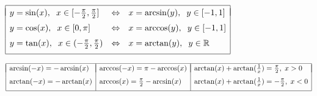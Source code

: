 \documentclass{article}
\begin{document}
$\begin{array}{|lll|}\hline && \\*[-9pt]
  y=\sin(x),\hspace{2 mm} x\in[-\frac{\pi}{2},\frac{\pi}{2}]&
  \iff &
  x=\arcsin(y),\hspace{2 mm} y\in[-1,1] \EndRow
  y=\cos(x),\hspace{2 mm} x\in[0,\pi]&
  \iff &
  x=\arccos(y),\hspace{2 mm} y\in[-1,1] \EndRow
  y=\tan(x),\hspace{2 mm} x\in(-\frac{\pi}{2},\frac{\pi}{2})&
  \iff &
  x=\arctan(y), \hspace{2 mm} y\in\mathbb{R}\\*[6pt]\hline
\end{array}$

\vspace{1 mm}

$\begin{array}{|l|l|l|}\hline & & \\*[-11pt]
\arcsin(-x)=-\arcsin(x) & \arccos(-x)=\pi-\arccos(x) &
  \arctan(x)+\arctan(\tfrac1x)=\frac\pi2, \; x>0 \EndRow %
\arctan(-x)=-\arctan(x) &\arccos(x)=\frac{\pi}{2}-\arcsin(x) &
  \arctan(x)+\arctan(\tfrac1x)=-\frac\pi2, \; x < 0 \\*[6pt] %
\hline
\end{array}$%

\subsection*{}%
\end{document}
